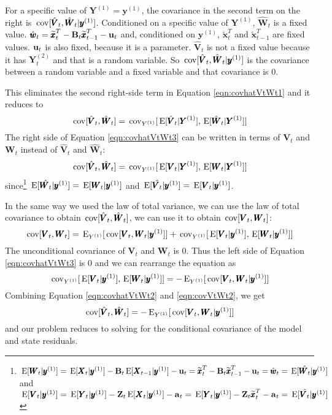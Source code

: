 \documentclass[]{article}
\def\UPS{\mbox{\boldmath $\Upsilon$}}
\def\XI{\mbox{\boldmath $\Xi$}}
\def\BB{\mbox{$\mathbf B$}}	\def\bb{\mbox{$\mathbf b$}} \def\Bb{\mbox{$\mathbf J$}} \def\Ba{\mbox{$\mathbf L$}} \def\Bm{\UPS}
\def\E{\,\textup{\textrm{E}}}
\def\VV{\mbox{$\pmb{V}$}}	\def\vv{\mbox{$\pmb{v}$}}
\def\WW{\mbox{$\pmb{W}$}}	\def\ww{\mbox{$\pmb{w}$}}
\def\XX{\mbox{$\pmb{X}$}}	\def\xx{\mbox{$\pmb{x}$}}
\def\YY{\mbox{$\pmb{Y}$}}	\def\yy{\mbox{$\pmb{y}$}}
\def\ZZ{\mbox{$\mathbf Z$}}	\def\zz{\mbox{$\mathbf z$}}	\def\Zb{\mbox{$\mathbf M$}} \def\Za{\mbox{$\mathbf N$}} \def\Zm{\XI}
\def\cov{\,\textup{\textrm{cov}}}
\def\hatxt{\widetilde{\xx}_t^T}
\def\hatxtm{\widetilde{\mbox{$\xx$}}_{t-1}^T}
\begin{document}
For a specific value of $\YY^{(1)}=\yy^{(1)}$, the covariance in the second term on the right is $\cov[\hat{\VV}_t, \hat{\WW}_t|\yy^{(1)}]$. Conditioned on a specific value of $\YY^{(1)}$, $\hat{\WW}_t$ is a fixed value. $\hat{\ww}_t = \hatxt - \BB_t\hatxtm - \uu_t$ and,  conditioned on $\yy^{(1)}$, $\hatxt$ and $\hatxtm$ are fixed values. $\mbox{$\mathbf u$}_t$ is also fixed, because it is a parameter. $\hat{\VV}_t$ is not a fixed value because it has $\YY_t^{(2)}$ and that is a random variable.  So $\cov[\hat{\VV}_t, \hat{\WW}_t|\yy^{(1)}]$ is the covariance between a random variable and a fixed variable and that covariance is 0.

This eliminates the second right-side term in Equation \ref{eqn:covhatVtWt1} and it reduces to
\begin{equation}\label{eqn:covhatVtWt3}
\cov[\hat{\VV}_t,\hat{\WW}_t] = \cov_{Y^{(1)}}[\E[\hat{\VV}_t|\YY^{(1)}],\E[\hat{\WW}_t|\YY^{(1)}]]
\end{equation}
The right side of Equation \ref{eqn:covhatVtWt3} can be written in terms of $\VV_t$ and $\WW_t$ instead of $\hat{\VV}_t$ and $\hat{\WW}_t$:
\begin{equation}\label{eqn:covhatVtWt2}
\cov[\hat{\VV}_t,\hat{\WW}_t] = \cov_{Y^{(1)}}[\E[\VV_t|\YY^{(1)}],\E[\WW_t|\YY^{(1)}]]
\end{equation}
since\footnote{$\E[\WW_t|\yy^{(1)}]= \E[\XX_t|\yy^{(1)}]-\BB_t\E[\XX_{t-1}|\yy^{(1)}] - \uu_t = \hatxt-\BB_t \hatxtm - \uu_t = \hat{\ww}_t = \E[\hat{\WW_t}|\yy^{(1)}]$ and 
$\E[\VV_t|\yy^{(1)}]= \E[\YY_t|\yy^{(1)}]-\ZZ_t\E[\XX_{t}|\yy^{(1)}] - \aa_t = \E[\YY_t|\yy^{(1)}]-\ZZ_t \hatxt - \aa_t = \E[\hat{\VV_t}|\yy^{(1)}]$} $\E[\hat{\WW_t}|\yy^{(1)}]=\E[\WW_t|\yy^{(1)}]$ and $\E[\hat{\VV_t}|\yy^{(1)}]=\E[\VV_t|\yy^{(1)}]$.

In the same way we used the law of total variance, we can use the law of total covariance  to obtain $\cov[\hat{\VV}_t,\hat{\WW}_t]$, we can use it to obtain $\cov[\VV_t, \WW_t]$:
\begin{equation}\label{eqn:covVtWt}
\cov[\VV_t, \WW_t] = \E_{Y^{(1)}}[\cov[\VV_t, \WW_t|\yy^{(1)}]] + \cov_{Y^{(1)}}[\E[\VV_t|\yy^{(1)}],\E[\WW_t|\yy^{(1)}]]\\ 
\end{equation}
The unconditional covariance of $\VV_t$ and $\WW_t$ is 0. Thus the left side of Equation \ref{eqn:covhatVtWt3} is 0 and we can rearrange the equation as
\begin{equation}\label{eqn:covVtWt2}
\cov_{Y^{(1)}}[\E[\VV_t|\yy^{(1)}],\E[\WW_t|\yy^{(1)}]] = - \E_{Y^{(1)}}[\cov[\VV_t, \WW_t|\yy^{(1)}]]
\end{equation}
Combining Equation \ref{eqn:covhatVtWt2} and \ref{eqn:covVtWt2}, we get
\begin{equation}\label{eqn:conditionalcovvtwt}
\cov[\hat{\VV}_t,\hat{\WW}_t] = - \E_{Y^{(1)}}[ \cov[\VV_t, \WW_t|\yy^{(1)}] ] 
\end{equation}
and our problem reduces to solving for the conditional covariance of the model and state residuals.  
\end{document}

